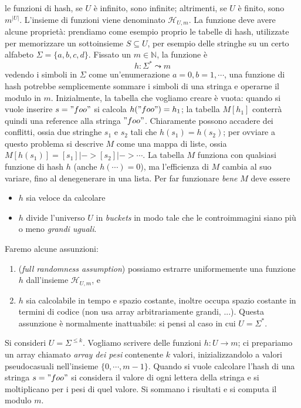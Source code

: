 le funzioni di hash, se $U$ è infinito, sono infinite; altrimenti, se $U$ è finito, sono $m^|U|$.
L'insieme di funzioni viene denominato $\mathcal{H}_{U,m}$.
La funzione deve avere alcune proprietà: prendiamo come esempio proprio le tabelle di hash,
utilizzate per memorizzare un sottoinsieme $S \subseteq U$, per esempio delle stringhe su un certo
alfabeto $\Sigma = \{a, b, c, d\}$. Fissato un $m \in \mathbb{N}$, la funzione è
$$
	h: \Sigma^* \leadsto m
$$
vedendo i simboli in $\Sigma$ come un'enumerazione $a = 0, b = 1, \cdots$, una funzione di hash
potrebbe semplicemente sommare i simboli di una stringa e operarne il modulo in $m$.
Inizialmente, la tabella che vogliamo creare è vuota: quando si vuole inserire $s = "foo"$
si calcola $h("foo") = h_1$; la tabella $M[h_1]$ conterrà quindi una reference alla stringa $"foo"$.
Chiaramente possono accadere dei conflitti, ossia due stringhe $s_1$ e $s_2$ tali che
$h(s_1) = h(s_2)$; per ovviare a questo problema si descrive $M$ come una mappa di liste, ossia
$M[h(s_1)] = [s_1] |-> [s_2] |-> \cdots$.  La tabella $M$ funziona con qualsiasi funzione di hash
$h$ (anche $h(\cdots) = 0$), ma l'efficienza di $M$ cambia al suo variare, fino al denegenerare in una
lista. Per far funzionare \textit{bene} $M$ deve essere
\begin{itemize}
	\item $h$ sia veloce da calcolare
	\item $h$ divide l'universo $U$ in \textit{buckets} in modo tale che le controimmagini siano
	      più o meno \textit{grandi uguali}. %
\end{itemize}

Faremo alcune assunzioni:
\begin{enumerate}
	\item (\textit{full randomness assumption}) possiamo estrarre uniformemente una funzione $h$ dall'insieme $\mathcal{H}_{U,m}$, e
	\item $h$ sia calcolabile in tempo e spazio costante, inoltre occupa spazio costante in termini di codice
	      (non usa array arbitrariamente grandi, ...). Questa assunzione è normalmente inattuabile: si pensi
	      al caso in cui $U = \Sigma^*$.
\end{enumerate}

Si consideri $U = \Sigma^{\leq k}$.  Vogliamo scrivere delle funzioni $h: U \rightarrow m$; ci
prepariamo un array chiamato \textit{array dei pesi} contenente $k$ valori, inizializzandolo a valori pseudocasuali nell'insieme $\{0, \cdots, m-1\}$.
Quando si vuole calcolare l'hash di una stringa $s = "foo"$ si considera il valore di ogni lettera della
stringa e si moltiplicano per i pesi di quel valore. Si sommano i risultati e si computa il modulo $m$.


